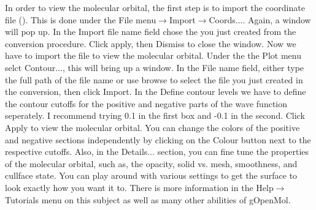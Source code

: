 In order to view the molecular orbital, the first step is to import the coordinate file 
(). This is done under the File menu$\rightarrow$Import$\rightarrow$Coords$\dots$. 
Again, a window will pop up. In the Import file name field chose the  you just 
created from the conversion procedure. Click apply, then Dismiss to close the window. Now
we have to import the  file to view the molecular orbital. Under the the 
Plot menu selct Contour$\dots$, this will bring up a window. In the File name field, 
either type the full path of the file name or use browse to select the  
file you just created in the conversion, then click Import. In the Define contour levels 
we have to define the contour cutoffs for the positive and negative parts of the wave 
function seperately. I recommend trying 0.1 in the first box and -0.1 in the second. Click 
Apply to view the molecular orbital. You can change the colors of the positive and negative 
sections independently by clicking on the Colour button next to the respective cutoffs. Also, 
in the Details$\dots$ section, you can fine tune the properties of the molecular orbital, 
such as, the opacity, solid vs. mesh, smoothness, and cullface state. You can play around 
with various settings to get the surface to look exactly how you want it to. There is more 
information in the Help$\rightarrow$Tutorials menu on this subject as well as many other abilities 
of gOpenMol.
